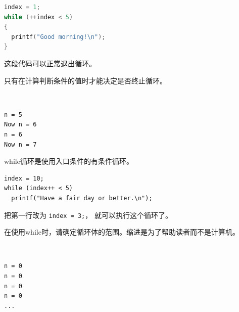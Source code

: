 \begin{frame}[fragile]
\begin{lstlisting}[language=c]
index = 1;
while (++index < 5)
{
  printf("Good morning!\n");
}
\end{lstlisting} 
\pause \vspace{0.1in}

这段代码可以正常退出循环。
\end{frame}

\begin{frame}[fragile]
只有在计算判断条件的值时才能决定是否终止循环。
\pause \vspace{.1in}

  \begin{minipage}{0.65\textwidth}
        
  \end{minipage}~~~~\pause  
  \begin{minipage}{0.3\textwidth}
    \begin{lstlisting}
n = 5
Now n = 6
n = 6
Now n = 7
\end{lstlisting}
    
  \end{minipage}


\end{frame}

\begin{frame}[fragile]
while循环是使用入口条件的有条件循环。 \pause \vspace{.1in}

\begin{lstlisting}
index = 10;
while (index++ < 5)
  printf("Have a fair day or better.\n");
\end{lstlisting}
\pause \vspace{.1in}

把第一行改为 \lstinline|index = 3;|，
就可以执行这个循环了。
\end{frame}

\begin{frame}[fragile]
在使用while时，请确定循环体的范围。缩进是为了帮助读者而不是计算机。
\end{frame}

\begin{frame}[fragile]
  \begin{minipage}{0.65\textwidth}
        
  \end{minipage} ~~~~\pause 
  \begin{minipage}{0.25\textwidth}
\begin{lstlisting}
n = 0
n = 0
n = 0
n = 0
... 
\end{lstlisting}    
  \end{minipage}
\end{frame}

